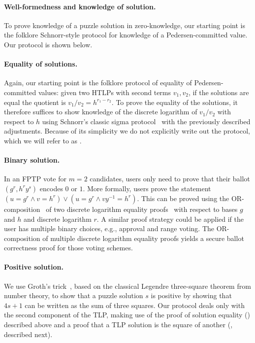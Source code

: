 \paragraph{Well-formedness and knowledge of solution.} 
To prove knowledge of a puzzle solution in zero-knowledge, our starting point is the folklore Schnorr-style protocol for knowledge of a Pedersen-committed value. Our protocol \zkpoks is shown below.


 
\paragraph{Equality of solutions.} 
Again, our starting point is the folklore protocol of equality of Pedersen-committed values: given two HTLPs with second terms $v_1, v_2$, if the solutions are equal the quotient is $v_1/v_2 = h^{r_1-r_2}$. To prove the equality of the solutions, it therefore suffices to show knowledge of the discrete logarithm of $v_1/v_2$ with respect to $h$ using Schnorr's classic sigma protocol~\cite{C:Schnorr89} with the previously described adjustments. Because of its simplicity we do not explicitly write out the protocol, which we will refer to as \zkposeq.

% 

\paragraph{Binary solution.} 
In an FPTP vote for $m=2$ candidates, users only need to prove that their ballot $(g^r,h^ry^s)$ encodes $0$ or $1$. More formally, users prove the statement $(u=g^r\land v=h^r)\lor(u=g^r\land vy^{-1}=h^r)$. This can be proved using the OR-composition~\cite{C:CraDamSch94} of two discrete logarithm equality proofs~\cite{C:ChaPed92} with respect to bases $g$ and $h$ and discrete logarithm $r$. A similar proof strategy could be applied if the user has multiple binary choices, e.g., approval and range voting. The OR-composition of multiple discrete logarithm equality proofs yields a secure ballot correctness proof for those voting schemes. 

\paragraph{Positive solution.} 
We use Groth's trick~\cite{ACNS:Groth05}, based on the classical Legendre three-square theorem from number theory, to show that a puzzle solution $s$ is positive by showing that $4s+1$ can be written as the sum of three squares. Our protocol deals only with the second component of the TLP, making use of the proof of solution equality (\zkposeq) described above and a proof that a TLP solution is the square of another (\zkposqs, described next).

